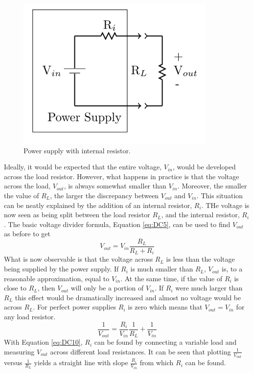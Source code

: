 \begin{figure}[H]
    \centering
    \includegraphics[scale = 0.8]{Images/DC8.PNG}
    \caption{Power supply with internal resistor.}
    \label{fig:DC8}
\end{figure}


Ideally, it would be expected that the entire voltage, $V_{in}$, would be developed across the load resistor. However, what happens in practice is that the voltage across the load, $V_{out}$, is always somewhat smaller than $V_{in}$. Moreover, the smaller the value of $R_L$, the larger the discrepancy between $V_{out}$ and $V_{in}$. This situation can be neatly explained by the addition of an internal resistor, $R_i$. THe voltage is now seen as being split between the load resistor $R_L$, and the internal resistor, $R_i$. The basic voltage divider formula, Equation \ref{eq:DC5}, can be used to find $V_{out}$ as before to get \begin{equation}\label{eq:DC9}
    V_{out} = V_{in}\frac{R_L}{R_L+R_i}
\end{equation}
What is now observable is that the voltage across $R_L$ is less than the voltage being supplied by the power supply. If $R_i$ is much smaller than $R_L$, $V_{out}$ is, to a reasonable approximation, equal to $V_{in}$. At the same time, if the value of $R_i$ is close to $R_L$, then $V_{out}$ will only be a portion of $V_{in}$. If $R_i$ were much larger than $R_L$ this effect would be dramatically increased and almost no voltage would be across $R_L$. For perfect power supplies $R_i$ is zero which means that $V_{out} = V_{in}$ for any load resistor. \begin{equation}\label{eq:DC10}
    \frac{1}{V_{out}} = \frac{R_i}{V_{in}}\frac{1}{R_L} + \frac{1}{V_{in}}
\end{equation}
With Equation \ref{eq:DC10}, $R_i$ can be found by connecting a variable load and measuring $V_{out}$ across different load resistances. It can be seen that plotting $\frac{1}{V_{out}}$ versus $\frac{1}{R_L}$ yields a straight line with slope $\frac{R_i}{V_{in}}$ from which $R_i$ can be found.

